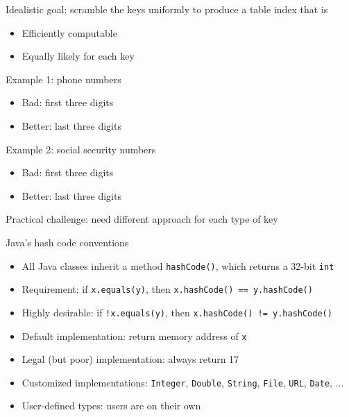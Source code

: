 \documentclass[8pt,a4paper,compress]{beamer}
\begin{document}
\begin{frame}[fragile]
\pause

Idealistic goal: scramble the keys uniformly to produce a table index that is
\begin{itemize}
\item Efficiently computable

\item Equally likely for each key
\end{itemize}

\pause
\bigskip

Example 1: phone numbers
\begin{itemize}
\item Bad: first three digits

\item Better: last three digits
\end{itemize}

\pause
\bigskip

Example 2: social security numbers
\begin{itemize}
\item Bad: first three digits

\item Better: last three digits
\end{itemize}

\pause
\bigskip

Practical challenge: need different approach for each type of key
\end{frame}

\begin{frame}[fragile]
\pause

Java's hash code conventions
\begin{itemize}
\item All Java classes inherit a method \lstinline{hashCode()}, which returns a 32-bit \lstinline{int}

\item Requirement: if \lstinline{x.equals(y)}, then \lstinline{x.hashCode() == y.hashCode()}

\item Highly desirable: if \lstinline{!x.equals(y)}, then \lstinline{x.hashCode() != y.hashCode()}

\item Default implementation: return memory address of \lstinline{x}

\item Legal (but poor) implementation: always return 17

\item Customized implementations: \lstinline{Integer}, \lstinline{Double}, \lstinline{String}, \lstinline{File}, \lstinline{URL}, \lstinline{Date}, ...

\item User-defined types: users are on their own
\end{itemize}
\end{frame}
\end{document}
